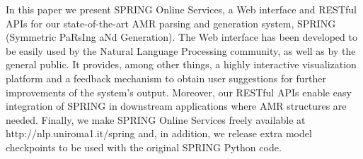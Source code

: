 In this paper we present SPRING Online Services, a Web interface and RESTful APIs
for our state-of-the-art AMR parsing and generation system, SPRING (Symmetric PaRsIng aNd Generation). 
The Web interface has been developed to be easily used by the Natural Language Processing community, as well as by the general public. 
It provides, among other things, a highly interactive visualization platform and a feedback mechanism to obtain user suggestions for further improvements of the system's output. 
Moreover, our RESTful APIs enable easy integration of SPRING in downstream applications where AMR structures are needed.
Finally, we make SPRING Online Services freely available at http://nlp.uniroma1.it/spring and, in addition, we release extra model checkpoints to be used with the original SPRING Python code.